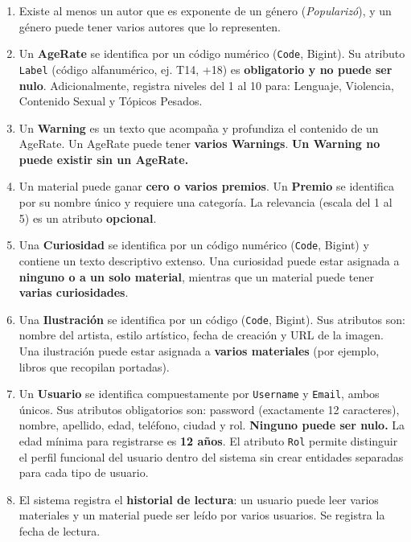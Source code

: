 \documentclass[12pt,a4paper]{article}
\begin{document}
\begin{enumerate}
    \item Existe al menos un autor que es exponente de un género (\textit{Popularizó}), y un género puede tener varios autores que lo representen.

    \item Un \textbf{AgeRate} se identifica por un código numérico (\texttt{Code}, Bigint). Su atributo \texttt{Label} (código alfanumérico, ej. T14, +18) es \textbf{obligatorio y no puede ser nulo}. Adicionalmente, registra niveles del 1 al 10 para: Lenguaje, Violencia, Contenido Sexual y Tópicos Pesados.

    \item Un \textbf{Warning} es un texto que acompaña y profundiza el contenido de un AgeRate. Un AgeRate puede tener \textbf{varios Warnings}. \textbf{Un Warning no puede existir sin un AgeRate.}

    \item Un material puede ganar \textbf{cero o varios premios}. Un \textbf{Premio} se identifica por su nombre único y requiere una categoría. La relevancia (escala del 1 al 5) es un atributo \textbf{opcional}.

    \item Una \textbf{Curiosidad} se identifica por un código numérico (\texttt{Code}, Bigint) y contiene un texto descriptivo extenso. Una curiosidad puede estar asignada a \textbf{ninguno o a un solo material}, mientras que un material puede tener \textbf{varias curiosidades}.

    \item Una \textbf{Ilustración} se identifica por un código (\texttt{Code}, Bigint). Sus atributos son: nombre del artista, estilo artístico, fecha de creación y URL de la imagen. Una ilustración puede estar asignada a \textbf{varios materiales} (por ejemplo, libros que recopilan portadas).

    \item Un \textbf{Usuario} se identifica compuestamente por \texttt{Username} y \texttt{Email}, ambos únicos. Sus atributos obligatorios son: password (exactamente 12 caracteres), nombre, apellido, edad, teléfono, ciudad y rol. \textbf{Ninguno puede ser nulo.} La edad mínima para registrarse es \textbf{12 años}. El atributo \texttt{Rol} permite distinguir el perfil funcional del usuario dentro del sistema sin crear entidades separadas para cada tipo de usuario.

    \item El sistema registra el \textbf{historial de lectura}: un usuario puede leer varios materiales y un material puede ser leído por varios usuarios. Se registra la fecha de lectura.


\end{enumerate}
\end{document}
